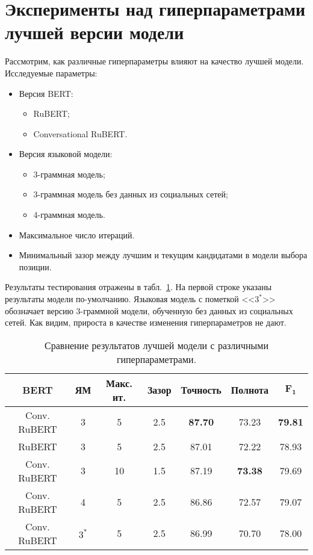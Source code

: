 \section{Эксперименты над гиперпараметрами лучшей версии модели}

Рассмотрим, как различные гиперпараметры влияют на качество лучшей модели. Исследуемые параметры:
\begin{itemize}
	\item Версия BERT:
	\begin{itemize}
		\item RuBERT;
		\item Conversational RuBERT.
	\end{itemize}
	\item Версия языковой модели:
	\begin{itemize}
		\item 3-граммная модель;
		\item 3-граммная модель без данных из социальных сетей;
		\item 4-граммная модель.
	\end{itemize}
	\item Максимальное число итераций.
	\item Минимальный зазор между лучшим и текущим кандидатами в модели выбора позиции.
\end{itemize}

Результаты тестирования отражены в табл.~\ref{table:hyperparam_results}. На первой строке указаны результаты модели по-умолчанию. Языковая модель с пометкой <<$3^*$>> обозначает версию 3-граммной модели, обученную без данных из социальных сетей. Как видим, прироста в качестве изменения гиперпараметров не дают.

\begin{table}[h]
	\begin{center}
		\caption{Сравнение результатов лучшей модели с различными гиперпараметрами.}
		\label{table:hyperparam_results}
		\begin{tabular}{|c|c|c|c|c|c|c|}
			\hline
			\textbf{BERT} & \textbf{ЯМ} & \textbf{Макс. ит.} & \textbf{Зазор} & \textbf{Точность} & \textbf{Полнота} & $\boldsymbol{F_1}$  \\
			\hline
			Conv. RuBERT & 3 & 5 & 2.5 & \textbf{87.70}  & 73.23 & \textbf{79.81} \\
			RuBERT & 3 & 5 & 2.5 & 87.01  & 72.22 & 78.93 \\
			Conv. RuBERT & 3 & 10 & 1.5 & 87.19  & \textbf{73.38} & 79.69 \\
			Conv. RuBERT & 4 & 5 & 2.5 & 86.86  & 72.57 & 79.07 \\
			Conv. RuBERT & $3^*$ & 5 & 2.5 & 86.99  & 70.70 & 78.00 \\
			\hline
		\end{tabular}
	\end{center}
\end{table}

